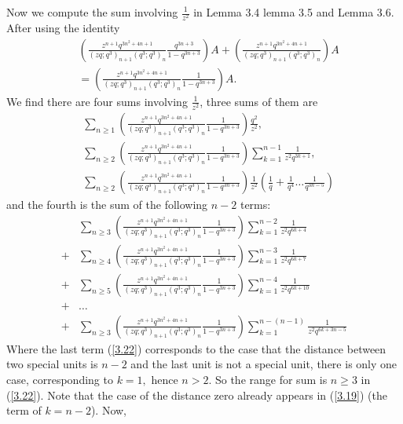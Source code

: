 \documentclass[draft]{amsart}
\numberwithin{equation}{section}
\theoremstyle{plain}
\theoremstyle{remark}
\begin{document}
Now we compute the sum involving $\frac{1}{z^{2}}$ in Lemma 3.4 lemma 3.5 and Lemma 3.6. After using the identity
\begin{align*}
&\left(\frac{z^{n+1}q^{3n^{2}+4n+1}}{(zq;q^{3})_{n+1}(q^{3};q^{3})_{n}} \frac{q^{3n+3}}{1-q^{3n+3}}\right)A+\left(\frac{z^{n+1}q^{3n^{2}+4n+1}}{(zq;q^{3})_{n+1}(q^{3};q^{3})_{n}}\right)A\\
&=\left(\frac{z^{n+1}q^{3n^{2}+4n+1}}{(zq;q^{3})_{n+1}(q^{3};q^{3})_{n}}\frac{1}{1-q^{3n+3}}\right)A.
\end{align*}
We find there are four sums involving $\frac{1}{z^{2}}$, three sums of them are
\begin{align}
&\sum_{n\geq 1}\left(\frac{z^{n+1}q^{3n^{2}+4n+1}}{(zq;q^{3})_{n+1}(q^{3};q^{3})_{n}}\frac{1}{1-q^{3n+3}}\right)\frac{q^{2}}{z^{2}},\\
&\sum_{n\geq 2}\left(\frac{z^{n+1}q^{3n^{2}+4n+1}}{(zq;q^{3})_{n+1}(q^{3};q^{3})_{n}}\frac{1}{1-q^{3n+3}}\right)\sum_{k=1}^{n-1}\frac{1}{z^{2}q^{3k+1}},\\
&\sum_{n\geq 2}\left(\frac{z^{n+1}q^{3n^{2}+4n+1}}{(zq;q^{3})_{n+1}(q^{3};q^{3})_{n}}\frac{1}{1-q^{3n+3}}\right)
\frac{1}{z^{2}}\left( \frac{1}{q} +\frac{1}{q^{4}}\dots\frac{1}{q^{3n-5}}    \right)
\end{align}
and the fourth is the sum of the following $n-2$ terms:
\begin{align}
&\sum_{n\geq 3}\left(\frac{z^{n+1}q^{3n^{2}+4n+1}}{(zq;q^{3})_{n+1}(q^{3};q^{3})_{n}}\frac{1}{1-q^{3n+3}}\right)\sum_{k=1}^{n-2}\frac{1}{z^{2}q^{6k+4}}\label{3.19}\\
+&\sum_{n\geq 4}\left(\frac{z^{n+1}q^{3n^{2}+4n+1}}{(zq;q^{3})_{n+1}(q^{3};q^{3})_{n}}\frac{1}{1-q^{3n+3}}\right)\sum_{k=1}^{n-3}\frac{1}{z^{2}q^{6k+7}}\\
+&\sum_{n\geq 5}\left(\frac{z^{n+1}q^{3n^{2}+4n+1}}{(zq;q^{3})_{n+1}(q^{3};q^{3})_{n}}\frac{1}{1-q^{3n+3}}\right)\sum_{k=1}^{n-4}\frac{1}{z^{2}q^{6k+10}}\\\nonumber
+&\dots\\
+&\sum_{n\geq 3}\left(\frac{z^{n+1}q^{3n^{2}+4n+1}}{(zq;q^{3})_{n+1}(q^{3};q^{3})_{n}}\frac{1}{1-q^{3n+3}}\right)\sum_{k=1}^{n-(n-1)}\frac{1}{z^{2}q^{6k+3n-5}}\label{3.22}
\end{align}
Where the last term (\ref{3.22}) corresponds to the case that the distance between two special units is $n-2$ and the last unit is not a special unit, there is only one case, corresponding to $k=1,$ hence $n>2$. So the range for sum is $n\geq 3$ in (\ref{3.22}). Note that the case of the distance  zero already appears in (\ref{3.19}) (the term of $k=n-2$). Now,
\end{document}
